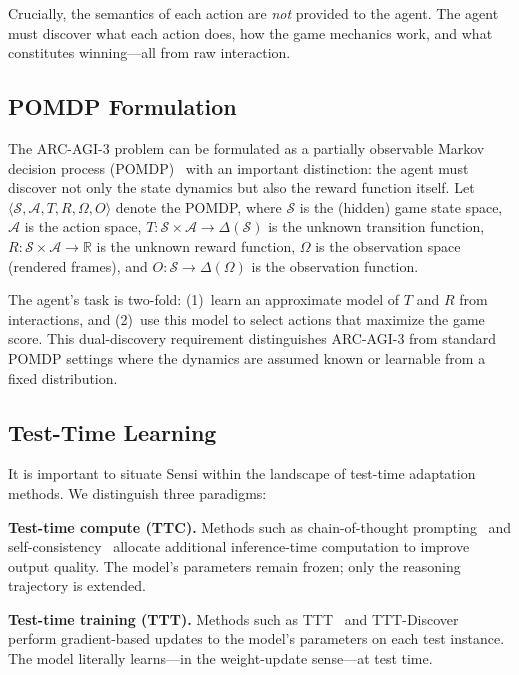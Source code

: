 \documentclass[11pt,letterpaper]{article}
\begin{document}
Crucially, the semantics of each action are \emph{not} provided to the agent. The agent must discover what each action does, how the game mechanics work, and what constitutes winning---all from raw interaction.

\subsection{POMDP Formulation}
\label{sec:pomdp}

The ARC-AGI-3 problem can be formulated as a partially observable Markov decision process (POMDP)~\citep{kaelbling1998planning} with an important distinction: the agent must discover not only the state dynamics but also the reward function itself. Let $\langle \mathcal{S}, \mathcal{A}, T, R, \Omega, O \rangle$ denote the POMDP, where $\mathcal{S}$ is the (hidden) game state space, $\mathcal{A}$ is the action space, $T: \mathcal{S} \times \mathcal{A} \to \Delta(\mathcal{S})$ is the unknown transition function, $R: \mathcal{S} \times \mathcal{A} \to \mathbb{R}$ is the unknown reward function, $\Omega$ is the observation space (rendered frames), and $O: \mathcal{S} \to \Delta(\Omega)$ is the observation function.

The agent's task is two-fold: (1)~learn an approximate model of $T$ and $R$ from interactions, and (2)~use this model to select actions that maximize the game score. This dual-discovery requirement distinguishes ARC-AGI-3 from standard POMDP settings where the dynamics are assumed known or learnable from a fixed distribution.

\subsection{Test-Time Learning}
\label{sec:ttl}

It is important to situate Sensi within the landscape of test-time adaptation methods. We distinguish three paradigms:

\textbf{Test-time compute (TTC).} Methods such as chain-of-thought
prompting~\citep{wei2022chain} and
self-consistency~\citep{wang2023selfconsistency} allocate additional
inference-time computation to improve output quality. The model's
parameters remain frozen; only the reasoning trajectory is extended.

\textbf{Test-time training (TTT).} Methods such as TTT~\citep{sun2024learning} and TTT-Discover~\citep{yuksekgonul2025tttdiscover} perform gradient-based updates to the model's parameters on each test instance. The model literally learns---in the weight-update sense---at test time.
\end{document}
